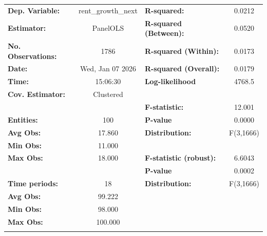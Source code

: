 \begin{center}
\begin{tabular}{lclc}
\toprule
\textbf{Dep. Variable:}          & rent\_growth\_next & \textbf{  R-squared:         }   &      0.0212      \\
\textbf{Estimator:}              &      PanelOLS      & \textbf{  R-squared (Between):}  &      0.0520      \\
\textbf{No. Observations:}       &        1786        & \textbf{  R-squared (Within):}   &      0.0173      \\
\textbf{Date:}                   &  Wed, Jan 07 2026  & \textbf{  R-squared (Overall):}  &      0.0179      \\
\textbf{Time:}                   &      15:06:30      & \textbf{  Log-likelihood     }   &      4768.5      \\
\textbf{Cov. Estimator:}         &     Clustered      & \textbf{                     }   &                  \\
\textbf{}                        &                    & \textbf{  F-statistic:       }   &      12.001      \\
\textbf{Entities:}               &        100         & \textbf{  P-value            }   &      0.0000      \\
\textbf{Avg Obs:}                &       17.860       & \textbf{  Distribution:      }   &    F(3,1666)     \\
\textbf{Min Obs:}                &       11.000       & \textbf{                     }   &                  \\
\textbf{Max Obs:}                &       18.000       & \textbf{  F-statistic (robust):} &      6.6043      \\
\textbf{}                        &                    & \textbf{  P-value            }   &      0.0002      \\
\textbf{Time periods:}           &         18         & \textbf{  Distribution:      }   &    F(3,1666)     \\
\textbf{Avg Obs:}                &       99.222       & \textbf{                     }   &                  \\
\textbf{Min Obs:}                &       98.000       & \textbf{                     }   &                  \\
\textbf{Max Obs:}                &      100.000       & \textbf{                     }   &                  \\
\textbf{}                        &                    & \textbf{                     }   &                  \\

\end{tabular}
\end{center}
